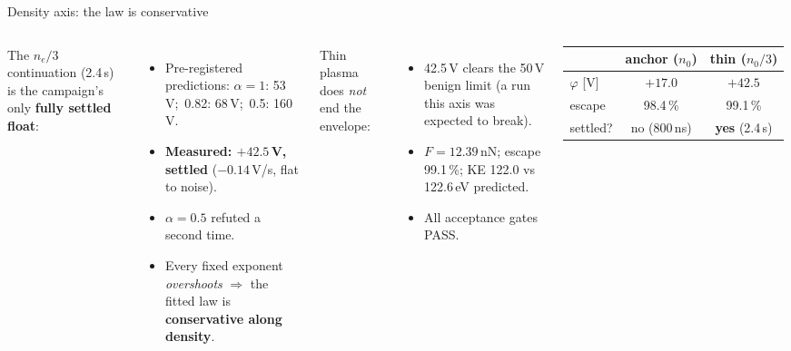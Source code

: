 \documentclass[10pt,aspectratio=169]{beamer}
\begin{document}
\begin{frame}{Density axis: the law is conservative}
  \begin{columns}
      \small The $n_e/3$ continuation (2.4\,\textmu s) is the
      campaign's only \textbf{fully settled float}:
      \begin{itemize}\small
        \item Pre-registered predictions:
              $\alpha{=}1$: 53\,V;\
              0.82: 68\,V;\
              0.5: 160\,V.
        \item \textbf{Measured: $+42.5$\,V, settled}
              ($-0.14$\,V/\textmu s, flat to noise).
        \item $\alpha = 0.5$ refuted a second time.
        \item Every fixed exponent \emph{overshoots}
              $\Rightarrow$ the fitted law is \textbf{conservative
              along density}.
      \end{itemize}
      \small Thin plasma does \emph{not} end the envelope:
      \begin{itemize}\small
        \item 42.5\,V clears the 50\,V benign limit (a run
              this axis was expected to break).
        \item $F = 12.39$\,nN; escape 99.1\,\%;
              KE 122.0 vs 122.6\,eV predicted.
        \item All acceptance gates PASS.
      \end{itemize}
      \vspace{1ex}
      \centering\footnotesize
      \begin{tabular}{lcc}
        \toprule
        & anchor ($n_0$) & thin ($n_0/3$) \\
        \midrule
        $\varphi$ [V] & $+17.0$ & $+42.5$ \\
        escape & 98.4\,\% & 99.1\,\% \\
        settled? & no (800\,ns) & \textbf{yes} (2.4\,\textmu s) \\
        \bottomrule
      \end{tabular}
  \end{columns}
\end{frame}
\end{document}
